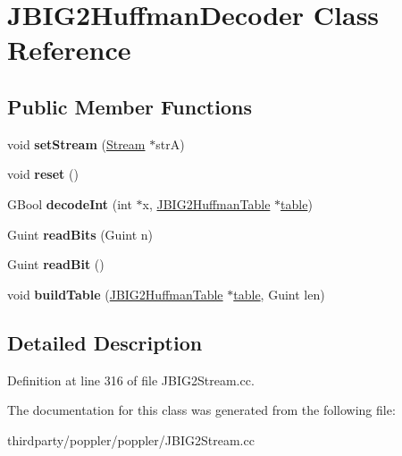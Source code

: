 \hypertarget{class_j_b_i_g2_huffman_decoder}{}\section{J\+B\+I\+G2\+Huffman\+Decoder Class Reference}
\label{class_j_b_i_g2_huffman_decoder}
\subsection*{Public Member Functions}
\begin{DoxyCompactItemize}
\item 
\mbox{\label{class_j_b_i_g2_huffman_decoder_a8551ac8b6be3a0fa743025ec8708dc71}} 
void {\bfseries set\+Stream} (\hyperlink{class_stream}{Stream} $\ast$strA)
\item 
\mbox{\label{class_j_b_i_g2_huffman_decoder_abda618e389d267ac96f0ffd205cca49f}} 
void {\bfseries reset} ()
\item 
\mbox{\label{class_j_b_i_g2_huffman_decoder_a543456e0d8a2dac80f29d8a466a0f751}} 
G\+Bool {\bfseries decode\+Int} (int $\ast$x, \hyperlink{struct_j_b_i_g2_huffman_table}{J\+B\+I\+G2\+Huffman\+Table} $\ast$\hyperlink{classtable}{table})
\item 
\mbox{\label{class_j_b_i_g2_huffman_decoder_a3a02311d2210e0b6613e906960a66ba6}} 
Guint {\bfseries read\+Bits} (Guint n)
\item 
\mbox{\label{class_j_b_i_g2_huffman_decoder_abcb697d947266edfe21a1179136abe4e}} 
Guint {\bfseries read\+Bit} ()
\item 
\mbox{\label{class_j_b_i_g2_huffman_decoder_a8570cd5bdda8088d89b06a8497e81d2d}} 
void {\bfseries build\+Table} (\hyperlink{struct_j_b_i_g2_huffman_table}{J\+B\+I\+G2\+Huffman\+Table} $\ast$\hyperlink{classtable}{table}, Guint len)
\end{DoxyCompactItemize}


\subsection{Detailed Description}


Definition at line 316 of file J\+B\+I\+G2\+Stream.\+cc.



The documentation for this class was generated from the following file\+:\begin{DoxyCompactItemize}
\item 
thirdparty/poppler/poppler/J\+B\+I\+G2\+Stream.\+cc\end{DoxyCompactItemize}
